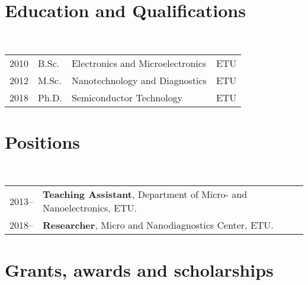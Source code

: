 \documentclass[a4paper,10pt]{article}
\begin{document}
\maketitle

\section{Education and Qualifications}

~\begin{tabular}{llll}
2010 & B.Sc. & Electronics and Microelectronics & ETU\\
2012 & M.Sc. & Nanotechnology and Diagnostics & ETU\\
2018 & Ph.D. & Semiconductor Technology & ETU
\end{tabular}


\section{Positions}

~\begin{tabular}{lP{15cm}}

2013--& \textbf{Teaching Assistant}, Department of Micro- and Nanoelectronics, ETU.\\
2018--& \textbf{Researcher}, Micro and Nanodiagnostics Center, ETU.
\end{tabular}

\section{Grants, awards and scholarships}
\end{document}
